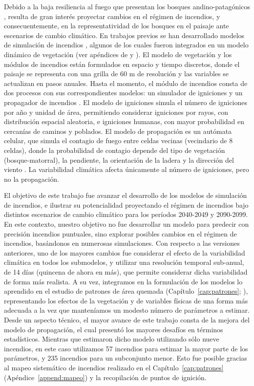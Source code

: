 Debido a la baja resiliencia al fuego que presentan los bosques andino-patagónicos \citep{kitzberger_firevegetation_2016}, resulta de gran interés proyectar cambios en el régimen de incendios, y consecuentemente, en la representatividad de los bosques en el paisaje ante escenarios de cambio climático. En trabajos previos se han desarrollado modelos de simulación de incendios \citep{morales_stochastic_2015, laneri_first_2020}, algunos de los cuales fueron integrados en un modelo dinámico de vegetación (ver apéndices de \citealt{tiribelli_non-additive_2019} y \citealt{kitzberger_projections_2022}). El modelo de vegetación y los módulos de incendios están formulados en espacio y tiempo discretos, donde el paisaje se representa con una grilla de 60 m de resolución y las variables se actualizan en pasos anuales. Hasta el momento, el módulo de incendios consta de dos procesos con sus correspondientes modelos: un simulador de igniciones y un propagador de incendios \citep{morales_stochastic_2015}. El modelo de igniciones simula el número de igniciones por año y unidad de área, permitiendo considerar igniciones por rayos, con distribución espacial aleatoria, e igniciones humanas, con mayor probabilidad en cercanías de caminos y poblados. El modelo de propagación es un autómata celular, que simula el contagio de fuego entre celdas vecinas (vecindario de 8 celdas), donde la probabilidad de contagio depende del tipo de vegetación (bosque-matorral), la pendiente, la orientación de la ladera y la dirección del viento \citep{morales_stochastic_2015}. La variabilidad climática afecta únicamente al número de igniciones, pero no la propagación.

El objetivo de este trabajo fue avanzar el desarrollo de los modelos de simulación de incendios, e ilustrar su potencialidad proyectando el régimen de incendios bajo distintos escenarios de cambio climático para los períodos 2040-2049 y 2090-2099. En este contexto, nuestro objetivo no fue desarrollar un modelo para predecir con precisión incendios puntuales, sino explorar posibles cambios en el régimen de incendios, basándonos en numerosas simulaciones. Con respecto a las versiones anteriores, uno de los mayores cambios fue considerar el efecto de la variabilidad climática en todos los submodelos, y utilizar una resolución temporal sub-anual, de 14 días (quincena de ahora en más), que permite considerar dicha variabilidad de forma más realista. A su vez, integramos en la formulación de los modelos lo aprendido en el estudio de patrones de área quemada (Capítulo~\ref{cap:patrones}; \citealt{barbera_patterns}), representando los efectos de la vegetación y de variables físicas de una forma más adecuada a la vez que manteníamos un modesto número de parámetros a estimar. Desde un aspecto técnico, el mayor avance de este trabajo consta de la mejora del modelo de propagación, el cual presentó los mayores desafíos en términos estadísticos. Mientras que \citet{morales_stochastic_2015} estimaron dicho modelo utilizando sólo nueve incendios, en este caso utilizamos 57 incendios para estimar la mayor parte de los parámetros, y 235 incendios para un subconjunto menor. Esto fue posible gracias al mapeo sistemático de incendios realizado en el Capítulo~\ref{cap:patrones} (Apéndice~\ref{append:mapeo}) y la recopilación de puntos de ignición. 

